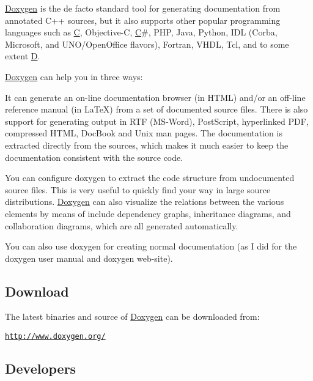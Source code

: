 \hyperlink{class_doxygen}{Doxygen} is the de facto standard tool for generating documentation from annotated C++ sources, but it also supports other popular programming languages such as \hyperlink{class_c}{C}, Objective-\/\+C, \hyperlink{class_c}{C}\#, P\+H\+P, Java, Python, I\+D\+L (Corba, Microsoft, and U\+N\+O/\+Open\+Office flavors), Fortran, V\+H\+D\+L, Tcl, and to some extent \hyperlink{class_d}{D}.

\hyperlink{class_doxygen}{Doxygen} can help you in three ways\+:


\begin{DoxyEnumerate}
\item It can generate an on-\/line documentation browser (in H\+T\+M\+L) and/or an off-\/line reference manual (in La\+Te\+X) from a set of documented source files. There is also support for generating output in R\+T\+F (M\+S-\/\+Word), Post\+Script, hyperlinked P\+D\+F, compressed H\+T\+M\+L, Doc\+Book and Unix man pages. The documentation is extracted directly from the sources, which makes it much easier to keep the documentation consistent with the source code.
\item You can configure doxygen to extract the code structure from undocumented source files. This is very useful to quickly find your way in large source distributions. \hyperlink{class_doxygen}{Doxygen} can also visualize the relations between the various elements by means of include dependency graphs, inheritance diagrams, and collaboration diagrams, which are all generated automatically.
\item You can also use doxygen for creating normal documentation (as I did for the doxygen user manual and doxygen web-\/site).
\end{DoxyEnumerate}

\subsection*{Download }

The latest binaries and source of \hyperlink{class_doxygen}{Doxygen} can be downloaded from\+:
\begin{DoxyItemize}
\item \href{http://www.doxygen.org/}{\tt http\+://www.\+doxygen.\+org/}
\end{DoxyItemize}

\subsection*{Developers }


